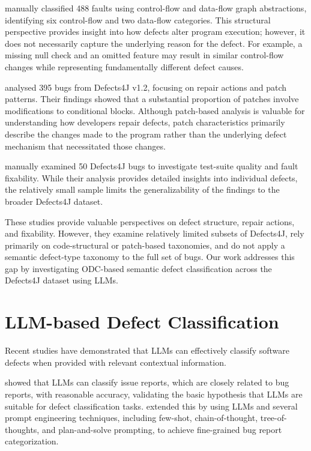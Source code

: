 \documentclass{iutbscthesis}
\begin{document}
\textcite{vanderspuy2025anatomy} manually classified 488 faults using control-flow and data-flow graph abstractions, identifying six control-flow and two data-flow categories. This structural perspective provides insight into how defects alter program execution; however, it does not necessarily capture the underlying reason for the defect. For example, a missing null check and an omitted feature may result in similar control-flow changes while representing fundamentally different defect causes.

\textcite{sobreira2018dissection} analysed 395 bugs from Defects4J v1.2, focusing on repair actions and patch patterns. Their findings showed that a substantial proportion of patches involve modifications to conditional blocks. Although patch-based analysis is valuable for understanding how developers repair defects, patch characteristics primarily describe the changes made to the program rather than the underlying defect mechanism that necessitated those changes.

\textcite{jiang2019manual} manually examined 50 Defects4J bugs to investigate test-suite quality and fault fixability. While their analysis provides detailed insights into individual defects, the relatively small sample limits the generalizability of the findings to the broader Defects4J dataset.

These studies provide valuable perspectives on defect structure, repair actions, and fixability. However, they examine relatively limited subsets of Defects4J, rely primarily on code-structural or patch-based taxonomies, and do not apply a semantic defect-type taxonomy to the full set of bugs. Our work addresses this gap by investigating ODC-based semantic defect classification across the Defects4J dataset using LLMs.

\section{LLM-based Defect Classification}

Recent studies have demonstrated that LLMs can effectively classify software defects when provided with relevant contextual information.

\textcite{colavito2024llm} showed that LLMs can classify issue reports, which are closely related to bug reports, with reasonable accuracy, validating the basic hypothesis that LLMs are suitable for defect classification tasks. \textcite{koyuncu2025exploring} extended this by using LLMs and several prompt engineering techniques, including few-shot, chain-of-thought, tree-of-thoughts, and plan-and-solve prompting, to achieve fine-grained bug report categorization.
\end{document}
